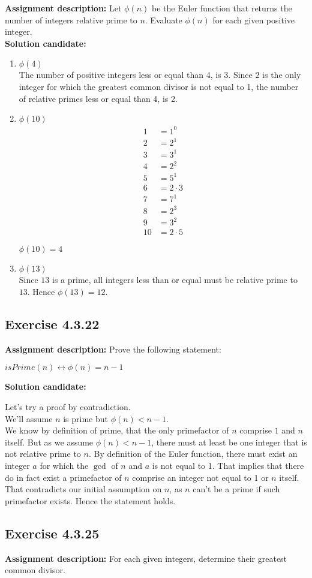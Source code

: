 \documentclass{report}
\newcommand{\cent}[1]{\begin{center}#1\end{center}}
\newcommand{\mAlign}[1]{\begin{align*}#1\end{align*}}
\newcommand{\AssignmentDescription}{\textbf{Assignment description: }}
\newcommand{\Solution}{\textbf{Solution candidate: }}
\newcommand{\QED}{\boxed{}}
\newcommand{\Exercise}[1]{\subsection{Exercise #1}}
\newcommand{\defaultEnumerateLabel}{\textbf{\alph*.}}
\newcommand{\MyItem}[1]{\item #1\\}
\begin{document}
\begin{enumerate}[label=\defaultEnumerateLabel]
	\AssignmentDescription
	Let $\phi(n)$ be the Euler function that returns the number of integers relative prime to $n$. Evaluate $\phi(n)$ for each given positive integer.\\
	
	\Solution
	
	\begin{enumerate}[label=\defaultEnumerateLabel]
		\MyItem{$\phi (4)$}
		
		The number of positive integers less or equal than 4, is 3. Since $2$ is the only integer for which the greatest common divisor is not equal to 1, the number of relative primes less or equal than 4, is 2.
		
		\MyItem{$\phi (10)$}
		
		\mAlign{
			1 &= 1^0 \\
			2 &= 2^1\\
			3 &= 3^1\\
			4 &= 2^2 \\
			5 &= 5^1 \\
			6 &= 2 \cdot 3\\
			7 &= 7^1 \\
			8 &= 2^3 \\
			9 &= 3^2 \\
			10 &= 2 \cdot 5 
		}
		
		\cent{$\phi (10) = 4$}
		
		\MyItem{$\phi(13)$}
		
		Since $13$ is a prime, all integers less than or equal must be relative prime to $13$. Hence $\phi(13) = 12$.
		
		
		
	\end{enumerate}
	\Exercise{4.3.22}
	
	\AssignmentDescription
	Prove the following statement:
	
	\cent{$isPrime(n) \leftrightarrow \phi(n) = n-1$}
	
	\Solution
	
	Let's try a proof by contradiction.\\
	
	We'll assume $n$ is prime but $\phi(n) < n-1$. \\
	
	We know by definition of prime, that the only primefactor of $n$ comprise $1$ and $n$ itself. But as we assume $\phi(n) < n-1$, there must at least be one integer that is not relative prime to $n$. By definition of the Euler function, there must exist an integer $a$ for which the $\gcd$ of $n$ and $a$ is not equal to 1. That implies that there do in fact exist a primefactor of $n$ comprise an integer not equal to 1 or $n$ itself. That contradicts our initial assumption on $n$, as $n$ can't be a prime if such primefactor exists. Hence the statement holds.\\
	\QED
	\Exercise{4.3.25}
	\AssignmentDescription
	For each given integers, determine their greatest common divisor.\\
	

\end{enumerate}
\end{document}
